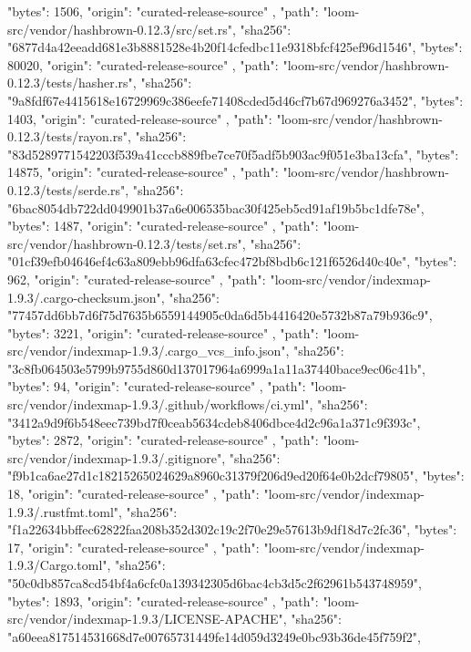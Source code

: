 {{      "bytes": 1506,
      "origin": "curated-release-source"
    },
    {
      "path": "loom-src/vendor/hashbrown-0.12.3/src/set.rs",
      "sha256": "6877d4a42eeadd681e3b8881528e4b20f14cfedbc11e9318bfcf425ef96d1546",
      "bytes": 80020,
      "origin": "curated-release-source"
    },
    {
      "path": "loom-src/vendor/hashbrown-0.12.3/tests/hasher.rs",
      "sha256": "9a8fdf67e4415618e16729969c386eefe71408cded5d46cf7b67d969276a3452",
      "bytes": 1403,
      "origin": "curated-release-source"
    },
    {
      "path": "loom-src/vendor/hashbrown-0.12.3/tests/rayon.rs",
      "sha256": "83d5289771542203f539a41cccb889fbe7ce70f5adf5b903ac9f051e3ba13cfa",
      "bytes": 14875,
      "origin": "curated-release-source"
    },
    {
      "path": "loom-src/vendor/hashbrown-0.12.3/tests/serde.rs",
      "sha256": "6bac8054db722dd049901b37a6e006535bac30f425eb5cd91af19b5bc1dfe78e",
      "bytes": 1487,
      "origin": "curated-release-source"
    },
    {
      "path": "loom-src/vendor/hashbrown-0.12.3/tests/set.rs",
      "sha256": "01cf39efb04646ef4c63a809ebb96dfa63cfec472bf8bdb6c121f6526d40c40e",
      "bytes": 962,
      "origin": "curated-release-source"
    },
    {
      "path": "loom-src/vendor/indexmap-1.9.3/.cargo-checksum.json",
      "sha256": "77457dd6bb7d6f75d7635b6559144905c0da6d5b4416420e5732b87a79b936c9",
      "bytes": 3221,
      "origin": "curated-release-source"
    },
    {
      "path": "loom-src/vendor/indexmap-1.9.3/.cargo_vcs_info.json",
      "sha256": "3c8fb064503e5799b9755d860d137017964a6999a1a11a37440bace9ec06c41b",
      "bytes": 94,
      "origin": "curated-release-source"
    },
    {
      "path": "loom-src/vendor/indexmap-1.9.3/.github/workflows/ci.yml",
      "sha256": "3412a9d9f6b548eec739bd7f0ceab5634cdeb8406dbce4d2c96a1a371c9f393c",
      "bytes": 2872,
      "origin": "curated-release-source"
    },
    {
      "path": "loom-src/vendor/indexmap-1.9.3/.gitignore",
      "sha256": "f9b1ca6ae27d1c18215265024629a8960c31379f206d9ed20f64e0b2dcf79805",
      "bytes": 18,
      "origin": "curated-release-source"
    },
    {
      "path": "loom-src/vendor/indexmap-1.9.3/.rustfmt.toml",
      "sha256": "f1a22634bbffec62822faa208b352d302c19c2f70e29e57613b9df18d7c2fc36",
      "bytes": 17,
      "origin": "curated-release-source"
    },
    {
      "path": "loom-src/vendor/indexmap-1.9.3/Cargo.toml",
      "sha256": "50c0db857ca8cd54bf4a6cfc0a139342305d6bac4cb3d5c2f62961b543748959",
      "bytes": 1893,
      "origin": "curated-release-source"
    },
    {
      "path": "loom-src/vendor/indexmap-1.9.3/LICENSE-APACHE",
      "sha256": "a60eea817514531668d7e00765731449fe14d059d3249e0bc93b36de45f759f2",
}}

